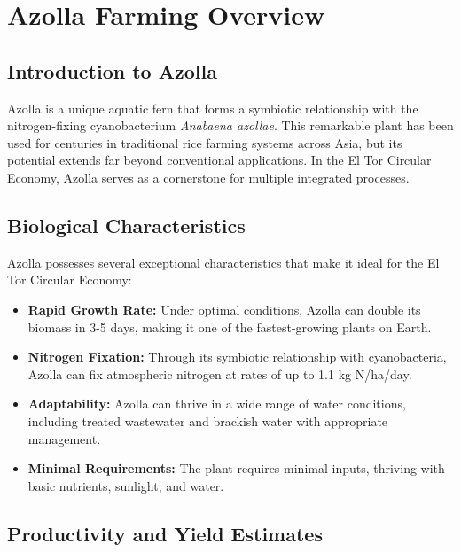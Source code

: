 \section{Azolla Farming Overview}

\subsection{Introduction to Azolla}

Azolla is a unique aquatic fern that forms a symbiotic relationship with the nitrogen-fixing cyanobacterium \textit{Anabaena azollae}. This remarkable plant has been used for centuries in traditional rice farming systems across Asia, but its potential extends far beyond conventional applications. In the El Tor Circular Economy, Azolla serves as a cornerstone for multiple integrated processes.

\subsection{Biological Characteristics}

Azolla possesses several exceptional characteristics that make it ideal for the El Tor Circular Economy:

\begin{itemize}
    \item \textbf{Rapid Growth Rate:} Under optimal conditions, Azolla can double its biomass in 3-5 days, making it one of the fastest-growing plants on Earth.
    
    \item \textbf{Nitrogen Fixation:} Through its symbiotic relationship with cyanobacteria, Azolla can fix atmospheric nitrogen at rates of up to 1.1 kg N/ha/day.
    
    \item \textbf{Adaptability:} Azolla can thrive in a wide range of water conditions, including treated wastewater and brackish water with appropriate management.
    
    \item \textbf{Minimal Requirements:} The plant requires minimal inputs, thriving with basic nutrients, sunlight, and water.
\end{itemize}

\subsection{Productivity and Yield Estimates}

